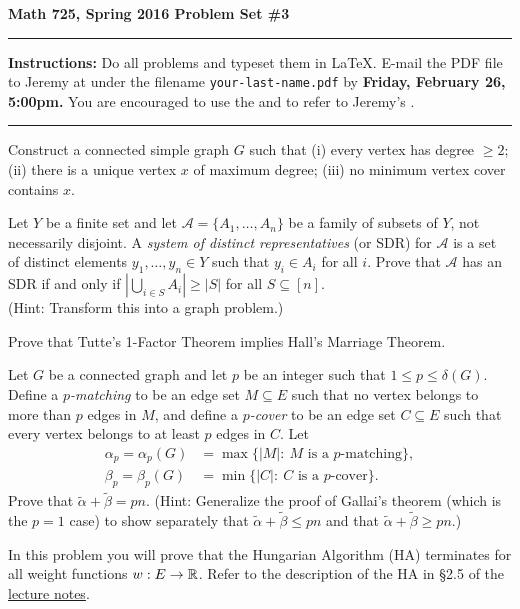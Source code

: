 

\thispagestyle{empty}
{\bf Math 725, Spring 2016 \hfill Problem Set \#3}
\smallskip\hrule

{\bf Instructions:} Do all problems and typeset them in \LaTeX.  E-mail the PDF file to Jeremy at  under the filename {\tt your-last-name.pdf} by {\bf Friday, February 26, 5:00pm.}
You are encouraged to use the  and to refer to Jeremy's .


\smallskip\hrule


\prob Construct a connected simple graph $G$ such that (i) every
vertex has degree $\geq 2$; (ii) there is a unique vertex $x$
of maximum degree; (iii) no minimum vertex cover contains $x$.

\prob Let $Y$ be a finite set and let $\mathcal{A}=\{A_1,\dots,A_n\}$
be a family of subsets of $Y$, not necessarily disjoint.  A \emph{system of distinct
representatives} (or SDR) for $\mathcal{A}$ is a set of distinct elements $y_1,\dots,y_n\in Y$
such that $y_i\in A_i$ for all $i$.
Prove that $\mathcal{A}$ has an SDR if and only if
$\left\vert\bigcup_{i\in S} A_i\right\vert\geq|S|$ for all $S\subseteq[n]$.\\
(Hint: Transform this into a graph problem.)

\prob Prove that Tutte's 1-Factor Theorem implies Hall's Marriage Theorem.

\prob Let $G$ be a connected graph and let $p$ be an integer such that $1\leq p\leq\delta(G)$.  Define a \emph{$p$-matching} to be an edge set $M\subseteq E$ such that no vertex belongs to more than $p$ edges in $M$, and define a \emph{$p$-cover} to be an edge set $C\subseteq E$ such that every vertex belongs to at least $p$ edges in $C$.  Let
\begin{align*}
\alpha_p=\alpha_p(G) &= \max\{|M|:~ M \text{ is a $p$-matching}\},\\
\beta_p=\beta_p(G) &= \min\{|C|:~ C \text{ is a $p$-cover}\}.
\end{align*}
Prove that $\tilde\alpha+\tilde\beta=pn$.  (Hint: Generalize the proof of Gallai's theorem (which is the $p=1$ case) to 
show separately that $\tilde\alpha+\tilde\beta\leq pn$ and that
$\tilde\alpha+\tilde\beta\geq pn$.)

\prob
In this problem you will prove that the Hungarian Algorithm (HA) terminates for all weight functions $w:E\to{\mathbb R}$.  Refer to the description of the HA in \S2.5 of the \href{http://www.jlmartin.faculty.ku.edu/math725/ExtraNotes.pdf}{lecture notes}.

